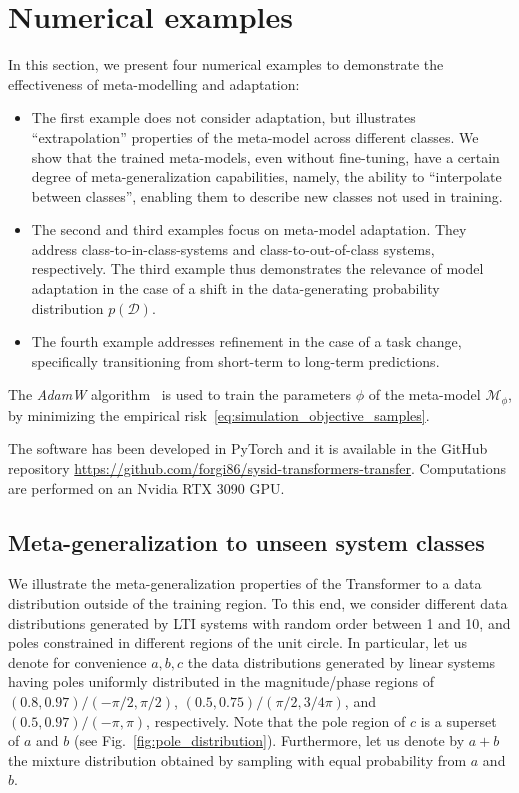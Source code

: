 \documentclass{ifacconf}
\newcommand{\free}{\mathcal{M}}
\begin{document}
\section{Numerical examples} \label{sec:examples}

In this section, we present four numerical examples to demonstrate the effectiveness of meta-modelling and adaptation:
\begin{itemize}
    \item The first example does not consider adaptation, but illustrates  ``extrapolation'' properties of the meta-model across different classes. We show that the trained meta-models, even without fine-tuning, have a certain degree  of meta-generalization capabilities, namely, the ability to ``interpolate between classes'', enabling them to describe new classes not used in training.
    \item The second and third examples focus on meta-model adaptation. They address class-to-in-class-systems and class-to-out-of-class systems, respectively. The third example thus demonstrates the relevance of model adaptation in the case of a shift in the data-generating probability distribution $p(\mathcal{D})$. 
    \item The fourth example addresses refinement in the case of a task change, specifically transitioning from short-term to long-term predictions.
\end{itemize}


The \emph{AdamW} algorithm~\citep{loshchilov2017decoupled} is used to train the parameters $\phi$ of the  meta-model $\free_\phi$, by minimizing the empirical risk~\eqref{eq:simulation_objective_samples}.

The software has been developed in PyTorch and it is  available in the GitHub repository \url{https://github.com/forgi86/sysid-transformers-transfer}. Computations are performed on an Nvidia RTX 3090 GPU.




\subsection{Meta-generalization to unseen system classes}
We illustrate the meta-generalization properties of the Transformer to a data distribution outside of the training region. To this end, we consider different data distributions generated by LTI systems with random order between 1 and 10, and poles constrained in different regions of the unit circle. In particular, let us denote for convenience $a, b, c$ the data distributions generated by linear systems  having poles uniformly distributed in the magnitude/phase regions of $(0.8, 0.97) / (-\pi/2, \pi/2)$, $(0.5, 0.75) / (\pi/2, 3/4\pi)$, and $(0.5, 0.97)/(-\pi, \pi)$, respectively.  Note that the pole region of $c$ is a superset of $a$ and $b$ (see Fig.~\ref{fig:pole_distribution}). 
Furthermore, let us denote by $a+b$ the mixture distribution obtained by sampling with equal probability from $a$ and $b$.
\end{document}
